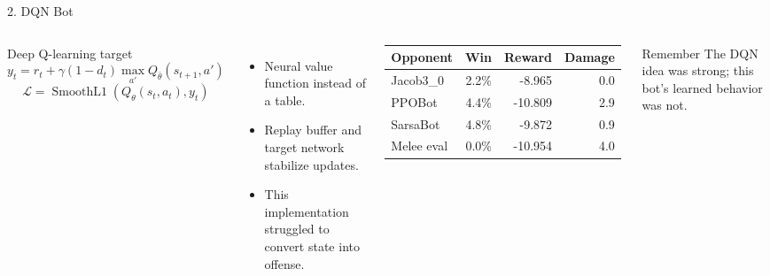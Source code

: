 \documentclass[12pt,aspectratio=169]{beamer}
\begin{document}
\begin{frame}{2. DQN Bot}
\begin{columns}[T,totalwidth=\textwidth]
\begin{block}{Deep Q-learning target}
\[
y_t = r_t+\gamma(1-d_t)\max_{a'}Q_{\bar\theta}(s_{t+1},a')
\]
\[
\mathcal{L}=\operatorname{SmoothL1}(Q_\theta(s_t,a_t),y_t)
\]
\end{block}
\begin{itemize}
  \item Neural value function instead of a table.
  \item Replay buffer and target network stabilize updates.
  \item This implementation struggled to convert state into offense.
\end{itemize}

\small
\begin{table}
\centering
\begin{tabular}{lrrr}
\toprule
\textbf{Opponent} & \textbf{Win} & \textbf{Reward} & \textbf{Damage} \\
\midrule
Jacob3\_0 & 2.2\% & -8.965 & 0.0 \\
PPOBot & 4.4\% & -10.809 & 2.9 \\
SarsaBot & 4.8\% & -9.872 & 0.9 \\
Melee eval & 0.0\% & -10.954 & 4.0 \\
\bottomrule
\end{tabular}
\end{table}
\begin{block}{Remember}
The DQN idea was strong; this bot's learned behavior was not.
\end{block}
\end{columns}
\end{frame}
\end{document}
